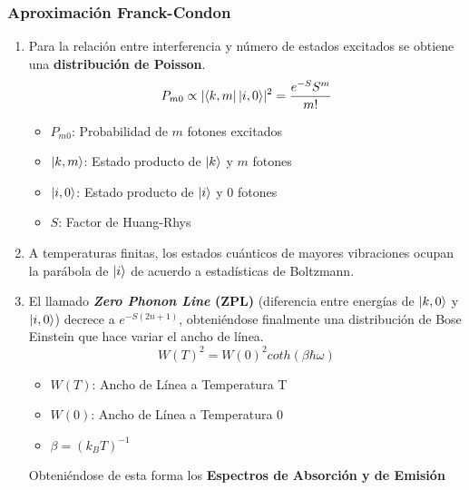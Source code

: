 \documentclass[aps,rmp,reprint,longbibliography]{revtex4-1}
\begin{document}
\subsubsection{Aproximación Franck-Condon}
\begin{enumerate}
\item Para la relación entre interferencia y número de estados excitados se obtiene una \textbf{distribución de Poisson}.
\begin{equation}\label{eq19}P_{m0}\propto
\lvert\bra{k,m}\ket{i,0}\rvert^2=\frac{e^{-S}S^m}{m!}\end{equation}
\begin{itemize}
    \item $P_{m0}$: Probabilidad de $m$ fotones excitados
    \item $\ket{k,m}$: Estado producto de $\ket{k}$ y $m$ fotones
    \item $\ket{i,0}$: Estado producto de $\ket{i}$ y $0$ fotones 
    \item $S$: Factor de Huang-Rhys
\end{itemize}
\item A temperaturas finitas, los estados cuánticos de mayores vibraciones ocupan la parábola de $\ket{i}$ de acuerdo a estadísticas de Boltzmann. 
\item El llamado \textbf{\textit{Zero Phonon Line} (ZPL)} (diferencia entre energías de $\ket{k,0}$ y $\ket{i,0}$) decrece a $e^{-S(2n+1)}$, obteniéndose finalmente una distribución de Bose Einstein que hace variar el ancho de línea.
\begin{equation}\label{eq20}W(T)^2=W(0)^2coth(\beta\hbar\omega)\end{equation}
\begin{itemize}
    \item $W(T)$: Ancho de Línea a Temperatura T
    \item $W(0)$: Ancho de Línea a Temperatura 0
    \item $\beta=(k_BT)^{-1}$
\end{itemize}
Obteniéndose de esta forma los \textbf{Espectros de Absorción y de Emisión}
\end{enumerate}
\end{document}
